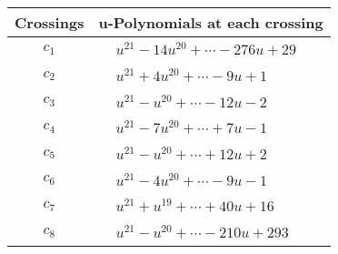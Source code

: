 \documentclass[1p]{elsarticle_modified}
\theoremstyle{definition}
\begin{document}
\begin{tabular}{m{50pt}|m{274pt}}
Crossings & \hspace{64pt}u-Polynomials at each crossing \\
\hline $$\begin{aligned}c_{1}\end{aligned}$$&$\begin{aligned}
&u^{21}-14 u^{20}+\cdots-276 u+29
\end{aligned}$\\
\hline $$\begin{aligned}c_{2}\end{aligned}$$&$\begin{aligned}
&u^{21}+4 u^{20}+\cdots-9 u+1
\end{aligned}$\\
\hline $$\begin{aligned}c_{3}\end{aligned}$$&$\begin{aligned}
&u^{21}- u^{20}+\cdots-12 u-2
\end{aligned}$\\
\hline $$\begin{aligned}c_{4}\end{aligned}$$&$\begin{aligned}
&u^{21}-7 u^{20}+\cdots+7 u-1
\end{aligned}$\\
\hline $$\begin{aligned}c_{5}\end{aligned}$$&$\begin{aligned}
&u^{21}- u^{20}+\cdots+12 u+2
\end{aligned}$\\
\hline $$\begin{aligned}c_{6}\end{aligned}$$&$\begin{aligned}
&u^{21}-4 u^{20}+\cdots-9 u-1
\end{aligned}$\\
\hline $$\begin{aligned}c_{7}\end{aligned}$$&$\begin{aligned}
&u^{21}+u^{19}+\cdots+40 u+16
\end{aligned}$\\
\hline $$\begin{aligned}c_{8}\end{aligned}$$&$\begin{aligned}
&u^{21}- u^{20}+\cdots-210 u+293
\end{aligned}$\\

\end{tabular}
\end{document}
